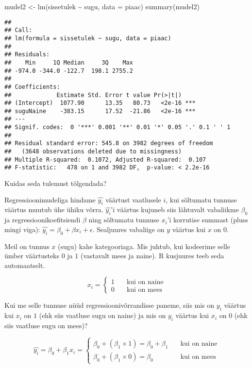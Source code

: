 \documentclass[
]{book}
\newenvironment{Shaded}{\begin{snugshade}}{\end{snugshade}}
\newcommand{\AttributeTok}[1]{\textcolor[rgb]{0.77,0.63,0.00}{#1}}
\newcommand{\FunctionTok}[1]{\textcolor[rgb]{0.00,0.00,0.00}{#1}}
\newcommand{\NormalTok}[1]{#1}
\newcommand{\OtherTok}[1]{\textcolor[rgb]{0.56,0.35,0.01}{#1}}
\newcommand{\SpecialCharTok}[1]{\textcolor[rgb]{0.00,0.00,0.00}{#1}}
\begin{document}
\begin{Shaded}
\begin{Highlighting}[]
\NormalTok{mudel2 }\OtherTok{\textless{}{-}} \FunctionTok{lm}\NormalTok{(sissetulek }\SpecialCharTok{\textasciitilde{}}\NormalTok{ sugu, }\AttributeTok{data =}\NormalTok{ piaac)}
\FunctionTok{summary}\NormalTok{(mudel2)}
\end{Highlighting}
\end{Shaded}

\begin{verbatim}
## 
## Call:
## lm(formula = sissetulek ~ sugu, data = piaac)
## 
## Residuals:
##    Min     1Q Median     3Q    Max 
## -974.0 -344.0 -122.7  198.1 2755.2 
## 
## Coefficients:
##             Estimate Std. Error t value Pr(>|t|)    
## (Intercept)  1077.90      13.35   80.73   <2e-16 ***
## suguNaine    -383.15      17.52  -21.86   <2e-16 ***
## ---
## Signif. codes:  0 '***' 0.001 '**' 0.01 '*' 0.05 '.' 0.1 ' ' 1
## 
## Residual standard error: 545.8 on 3982 degrees of freedom
##   (3648 observations deleted due to missingness)
## Multiple R-squared:  0.1072, Adjusted R-squared:  0.107 
## F-statistic:   478 on 1 and 3982 DF,  p-value: < 2.2e-16
\end{verbatim}

Kuidas seda tulemust tõlgendada?

Regressioonimudeliga hindame \(\hat{y_i}\) väärtust vaatlusele \(i\), kui sõltumatu tunnuse väärtus muutub ühe ühiku võrra. \(\hat{y_i}\)'i väärtus kujuneb siis lähtuvalt vabaliikme \(\beta_0\) ja regressioonikoefitsiendi \(\beta\) ning sõltumatu tunnuse \(x_i\)'i korrutise summast (pluss mingi viga): \(\hat{y_i}=\beta_0+\beta x_i+\epsilon\). Sealjuures vabaliige on \(y\) väärtus kui \(x\) on \(0\).

Meil on tunnus \(x\) (sugu) kahe kategooriaga. Mis juhtub, kui kodeerime selle ümber väärtusteks \(0\) ja \(1\) (vastavalt mees ja naine). R kusjuures teeb seda automaatselt.

\[ x_{i} =
  \begin{cases}
    1  & \quad \text{kui on naine}\\
    0  & \quad \text{kui on mees}
  \end{cases}
\]

Kui me selle tunnuse nüüd regressioonivõrrandisse paneme, siis mis on \(y_i\) väärtus kui \(x_i\) on \(1\) (ehk siis vaatluse sugu on naine) ja mis on \(y_i\) väärtus kui \(x_i\) on \(0\) (ehk siis vaatluse sugu on mees)?

\[ \hat{y_i}=\beta_0+\beta_1 x_i =
  \begin{cases}
    \beta_0+(\beta_1 \times 1) = \beta_0+\beta_1  & \quad \text{kui on naine}\\
    \beta_0+(\beta_1 \times 0) = \beta_0  & \quad \text{kui on mees}
  \end{cases}
\]
\end{document}
